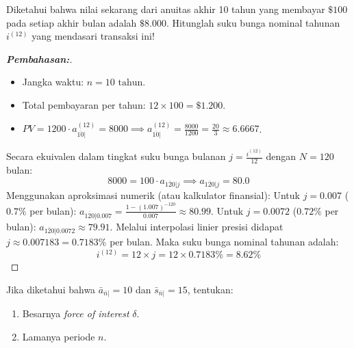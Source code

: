 \documentclass[11pt,a4paper]{article}
\begin{document}
\vspace{1em}

\begin{examplebox}
Diketahui bahwa nilai sekarang dari anuitas akhir 10 tahun yang membayar $\$100$ pada setiap akhir bulan adalah $\$8.000$. Hitunglah suku bunga nominal tahunan $i^{(12)}$ yang mendasari transaksi ini!
\end{examplebox}

\begin{proof}[\textbf{Pembahasan:}]
\begin{itemize}
    \item Jangka waktu: $n = 10\text{ tahun}$.
    \item Total pembayaran per tahun: $12 \times 100 = \$1.200$.
    \item $PV = 1200 \cdot a_{\overline{10}|}^{(12)} = 8000 \implies a_{\overline{10}|}^{(12)} = \frac{8000}{1200} = \frac{20}{3} \approx 6.6667$.
\end{itemize}
Secara ekuivalen dalam tingkat suku bunga bulanan $j = \frac{i^{(12)}}{12}$ dengan $N = 120$ bulan:
\begin{equation*}
    8000 = 100 \cdot a_{\overline{120}|j} \implies a_{\overline{120}|j} = 80.0
\end{equation*}
Menggunakan aproksimasi numerik (atau kalkulator finansial):
Untuk $j = 0.007$ ($0.7\%$ per bulan): $a_{\overline{120}|0.007} = \frac{1 - (1.007)^{-120}}{0.007} \approx 80.99$.
Untuk $j = 0.0072$ ($0.72\%$ per bulan): $a_{\overline{120}|0.0072} \approx 79.91$.
Melalui interpolasi linier presisi didapat $j \approx 0.007183 = 0.7183\%$ per bulan.
Maka suku bunga nominal tahunan adalah:
\begin{equation*}
    i^{(12)} = 12 \times j = 12 \times 0.7183\% = \mathbf{8.62\%}
\end{equation*}
\end{proof}

\vspace{1em}

\begin{examplebox}
Jika diketahui bahwa $\bar{a}_{\overline{n}|} = 10$ dan $\bar{s}_{\overline{n}|} = 15$, tentukan:
\begin{enumerate}[label=\alph*.]
    \item Besarnya \textit{force of interest} $\delta$.
    \item Lamanya periode $n$.
\end{enumerate}
\end{examplebox}
\end{document}

